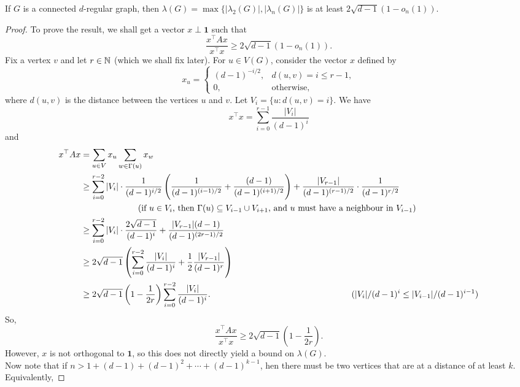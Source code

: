 			\begin{ftheo}
				If $G$ is a connected $d$-regular graph, then $\lambda(G) = \max\{|\lambda_2(G)|,|\lambda_n(G)|\}$ is at least $2\sqrt{d-1}(1-o_n(1))$.
			\end{ftheo}
			\begin{proof}
				To prove the result, we shall get a vector $x\perp\mathbf{1}$ such that
				\[ \frac{x^\top A x}{x^\top x} \ge 2\sqrt{d-1}(1-o_n(1)). \]
				Fix a vertex $v$ and let $r\in\mathbb{N}$ (which we shall fix later). For $u\in V(G)$, consider the vector $x$ defined by
				\[ x_u =
				\begin{cases}
					(d-1)^{-i/2}, & d(u,v) = i \le r-1, \\
					0, & \text{otherwise,}
				\end{cases}
				\]
				where $d(u,v)$ is the distance between the vertices $u$ and $v$. Let $V_i = \{u : d(u,v) = i\}$. We have
				\[ x^\top x = \sum_{i=0}^{r-1} \frac{|V_i|}{(d-1)^i} \]
				and
				\begin{align*}
					x^\top A x &= \sum_{u\in V} x_u \sum_{w \in \Gamma(u)} x_w \\
						&\ge \sum_{i=0}^{r-2} |V_i| \cdot \frac{1}{(d-1)^{i/2}} \left( \frac{1}{(d-1)^{(i-1)/2}} + \frac{(d-1)}{(d-1)^{(i+1)/2}} \right) + \frac{|V_{r-1}|}{(d-1)^{(r-1)/2}} \cdot \frac{1}{(d-1)^{r/2}} \\
						&\quad\hspace{20mm} (\text{if $u \in V_i$, then $\Gamma(u) \subseteq V_{i-1} \cup V_{i+1}$, and $u$ must have a neighbour in $V_{i-1}$}) \\
						&\ge \sum_{i=0}^{r-2} |V_i|\cdot\frac{2\sqrt{d-1}}{(d-1)^{i}} + \frac{|V_{r-1}| (d-1)}{(d-1)^{(2r-1)/2}} \\
						&\ge 2\sqrt{d-1} \left( \sum_{i=0}^{r-2} \frac{|V_i|}{(d-1)^i} + \frac{1}{2} \frac{|V_{r-1}|}{(d-1)^r} \right) \\
						&\ge 2\sqrt{d-1} \left( 1 - \frac{1}{2r} \right) \sum_{i=0}^{r-2} \frac{|V_i|}{(d-1)^i}. & \hspace{-30mm} (|V_i|/(d-1)^i \le |V_{i-1}|/(d-1)^{i-1})
				\end{align*}
				So,
				\[ \frac{x^\top A x}{x^\top x} \ge 2\sqrt{d-1} \left( 1 - \frac{1}{2r} \right). \]
				However, $x$ is not orthogonal to $\mathbf{1}$, so this does not directly yield a bound on $\lambda(G)$.\\
				Now note that if $n > 1 + (d-1) + (d-1)^2 + \cdots + (d-1)^{k-1}$, hen there must be two vertices that are at a distance of at least $k$. Equivalently,

\end{proof}
